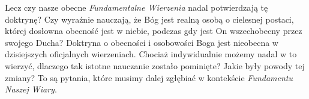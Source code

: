 Lecz czy nasze obecne \textit{Fundamentalne Wierzenia} nadal potwierdzają tę doktrynę? Czy wyraźnie nauczają, że Bóg jest realną osobą o cielesnej postaci, której dosłowna obecność jest w niebie, podczas gdy jest On wszechobecny przez swojego Ducha? Doktryna o obecności i osobowości Boga jest nieobecna w dzisiejszych oficjalnych wierzeniach. Chociaż indywidualnie możemy nadal w to wierzyć, dlaczego tak istotne nauczanie zostało pominięte? Jakie były powody tej zmiany? To są pytania, które musimy dalej zgłębiać w kontekście \textit{Fundamentu Naszej Wiary}.


